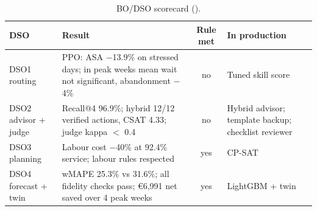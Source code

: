 \begin{table}[!htbp]
\centering\small
\caption{BO/DSO scorecard ().}
\label{tab:scorecard}
\begin{tabularx}{\textwidth}{@{}lYcY@{}}
\toprule
\textbf{DSO} & \textbf{Result} & \textbf{Rule met} & \textbf{In production} \\
\midrule
DSO1 routing & PPO: ASA $-$13.9\% on stressed days; in peak weeks mean wait not significant, abandonment
  $-$4\% & no & Tuned skill score \\
DSO2 advisor + judge & Recall@4 96.9\%; hybrid 12/12 verified actions, CSAT 4.33; judge kappa $<$ 0.4 & no &
  Hybrid advisor; template backup; checklist reviewer \\
DSO3 planning & Labour cost $-$40\% at 92.4\% service; labour rules respected & yes & CP-SAT \\
DSO4 forecast + twin & wMAPE 25.3\% vs 31.6\%; all fidelity checks pass; €6,991 net saved over 4 peak weeks &
  yes & LightGBM + twin \\
\bottomrule
\end{tabularx}
\end{table}
